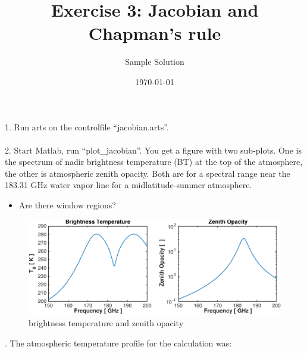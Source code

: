 \documentclass[paper=a4, fontsize=11pt]{scrartcl} %
\title{Exercise 3: Jacobian and Chapman's rule}
\author{Sample Solution}
\date{\normalsize\today}
\begin{document}
\maketitle

1. Run arts on the controlfile ``jacobian.arts''.\ \\
\ \\2. Start Matlab, run ``plot\_jacobian''. You get a figure with two sub-plots. 
One is the spectrum of nadir brightness temperature (BT) at the top of the atmosphere, the other is atmospheric zenith opacity. 
Both are for a spectral range near the 183.31 GHz water vapor line for a midlatitude-summer atmosphere.\ \\

\begin{itemize}
	\item Are there window regions?
\end{itemize}

\begin{figure}[h!]
\centering
 	\includegraphics[width=\textwidth]{plots/bt_op_part1.pdf}
 	\caption{brightness temperature and zenith opacity}
\end{figure}

. The atmospheric temperature profile for the calculation was: \ \\
\end{document}
